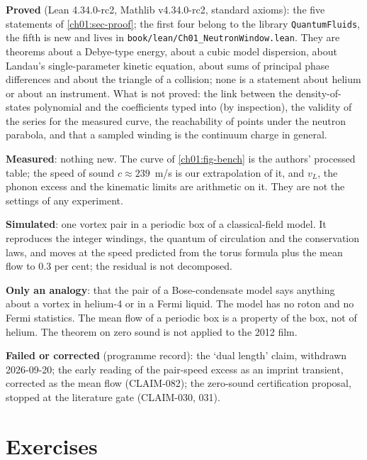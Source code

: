 \begin{honestbox}
\textbf{Proved} (Lean 4.34.0-rc2, Mathlib v4.34.0-rc2, standard axioms): the five statements of \cref{ch01:sec-proof}; the first four belong to the library \texttt{QuantumFluids}, the fifth is new and lives in \texttt{book/lean/Ch01\_NeutronWindow.lean}. They are theorems about a Debye-type energy, about a cubic model dispersion, about Landau's single-parameter kinetic equation, about sums of principal phase differences and about the triangle of a collision; none is a statement about helium or about an instrument. What is not proved: the link between the density-of-states polynomial and the coefficients typed into  (by inspection), the validity of the series for the measured curve, the reachability of points under the neutron parabola, and that a sampled winding is the continuum charge in general.
\par\smallskip\noindent\textbf{Measured}: nothing new. The curve of \cref{ch01:fig-bench} is the authors' processed table; the speed of sound $c\approx239$~m/s is our extrapolation of it, and $v_L$, the phonon excess and the kinematic limits are arithmetic on it. They are not the settings of any experiment.
\par\smallskip\noindent\textbf{Simulated}: one vortex pair in a periodic box of a classical-field model. It reproduces the integer windings, the quantum of circulation and the conservation laws, and moves at the speed predicted from the torus formula plus the mean flow to 0.3 per cent; the residual is not decomposed.
\par\smallskip\noindent\textbf{Only an analogy}: that the pair of a Bose-condensate model says anything about a vortex in helium-4 or in a Fermi liquid. The model has no roton and no Fermi statistics. The mean flow of a periodic box is a property of the box, not of helium. The theorem on zero sound is not applied to the 2012 film.
\par\smallskip\noindent\textbf{Failed or corrected} (programme record): the `dual length' claim, withdrawn 2026-09-20; the early reading of the pair-speed excess as an imprint transient, corrected as the mean flow (CLAIM-082); the zero-sound certification proposal, stopped at the literature gate (CLAIM-030, 031).
\end{honestbox}

\section*{Exercises}

